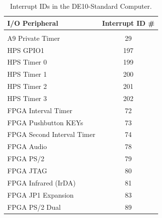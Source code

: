 \documentclass[11pt, twoside, pdftex]{article}
\newcommand{\commonFiles}{../../../common/doc}
\newcommand{\systemName}{DE10-Standard Computer}
\begin{document}










\begin{table}[h]
    \begin{center}
    \begin{tabular}{l|c}
          \textbf{I/O Peripheral} &
          \textbf{Interrupt ID \#}        \\
          \hline\vspace{-3mm}             \\
          A9 Private Timer & 29           \\
          HPS GPIO1 & 197                 \\
          HPS Timer 0 & 199               \\
          HPS Timer 1 & 200               \\
          HPS Timer 2 & 201               \\
          HPS Timer 3 & 202               \\
		  FPGA Interval Timer & 72        \\
		  FPGA Pushbutton KEYs & 73       \\
		  FPGA Second Interval Timer & 74 \\
		  FPGA Audio & 78                 \\
		  FPGA PS/2 & 79                  \\
		  FPGA JTAG & 80                  \\
		  FPGA Infrared (IrDA) & 81       \\
		  FPGA JP1 Expansion & 83         \\
		  FPGA PS/2 Dual & 89             \\
    \end{tabular}
    \caption{Interrupt IDs in the \systemName.}
	\label{tab:irq}
    \end{center}
\end{table}








\end{document}
